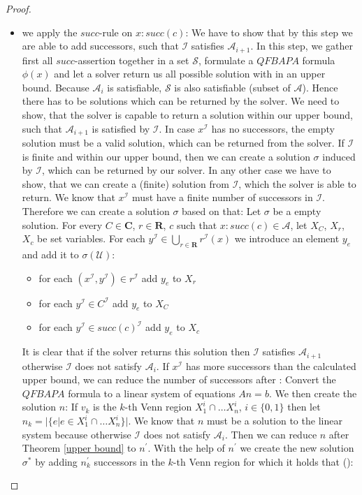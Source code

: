 \documentclass{book}
\theoremstyle{break}
\theoremstyle{definition}
\begin{document}
\begin{proof}
\begin{itemize}
\item we apply the $succ$-rule on $x:succ(c)$: We have to show that by this step we are able to add successors, such that $\mathcal{I}$ satisfies $\mathcal{A}_{i+1}$. In this step, we gather first all $succ$-assertion together in a set $\mathcal{S}$, formulate a $QFBAPA$ formula $\phi(x)$ and let a solver return us all possible solution with in an upper bound. Because $\mathcal{A}_i$ is satisfiable, $\mathcal{S}$ is also satisfiable (subset of $\mathcal{A}$). Hence there has to be solutions which can be returned by the solver. We need to show, that the solver is capable to return a solution within our upper bound, such that $\mathcal{A}_{i+1}$ is satisfied by $\mathcal{I}$. In case $x^\mathcal{I}$ has no successors, the empty solution must be a valid solution, which can be returned from the solver. If $\mathcal{I}$ is finite and within our upper bound, then we can create a solution $\sigma$ induced by $\mathcal{I}$, which can be returned by our solver. In any other case we have to show, that we can create a (finite) solution from $\mathcal{I}$, which the solver is able to return. We know that $x^\mathcal{I}$ must have a finite number of successors in $\mathcal{I}$. Therefore we can create a solution $\sigma$ based on that: Let $\sigma$ be a empty solution. For every $C\in\mathbf{C}$, $r\in\mathbf{R}$, $c$ such that $x:succ(c)\in\mathcal{A}$, let $X_C$, $X_r$, $X_c$ be set variables. For each $y^\mathcal{I}\in \bigcup_{r\in\mathbf{R}}r^\mathcal{I}(x)$ we introduce an element $y_e$ and add it to $\sigma(\mathcal{U})$:
\begin{itemize}
\item for each $(x^\mathcal{I},y^\mathcal{I})\in r^\mathcal{I}$ add $y_e$ to $X_r$
\item for each $y^\mathcal{I}\in C^\mathcal{I}$ add $y_e$ to $X_C$
\item for each $y^\mathcal{I}\in succ(c)^\mathcal{I}$ add $y_e$ to $X_c$
\end{itemize}
It is clear that if the solver returns this solution then $\mathcal{I}$ satisfies $\mathcal{A}_{i+1}$ otherwise $\mathcal{I}$ does not satisfy $\mathcal{A}_i$. If $x^\mathcal{I}$ has more successors than the calculated upper bound, we can reduce the number of successors after \cite{knapsack}: Convert the $QFBAPA$ formula to a linear system of equations $An=b$. We then create the solution $n$: If $v_k$ is the $k$-th Venn region $X_1^i\cap\dots X_n^i$, $i\in\{0,1\}$ then let $n_k=|\{e|e\in X_1^i\cap\dots X_n^i\}|$. We know that $n$ must be a solution to the linear system because otherwise $\mathcal{I}$ does not satisfy $\mathcal{A}_i$. Then we can reduce $n$ after Theorem \ref{upper bound} to $n^\prime$. With the help of $n^\prime$ we create the new solution $\sigma^\ast$ by adding $n^\prime_k$ successors in the $k$-th Venn region for which it holds that (\dag):

\end{itemize}
\end{proof}
\end{document}
